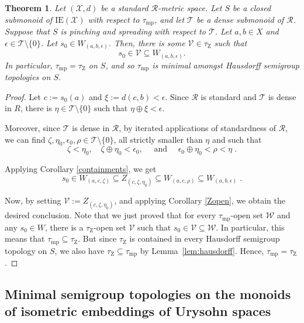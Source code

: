 \documentclass{article}
\newtheorem{theorem}{Theorem}[section]
\theoremstyle{remark}
\theoremstyle{definition}
\newcommand{\V}[0]{\mathcal{V}}
\newcommand{\W}[0]{\mathcal{W}}
\newcommand{\zar}[0]{\tau_{\mathrm{Z}}}
\newcommand{\mpw}[0]{\tau_{\mathrm{mp}}}
\newcommand{\rr}[0]{\mathcal{R}}
\newcommand{\ie}[0]{\mathrm{IE}}
\begin{document}
{{{{{\begin{theorem} \label{Urirealproof} Let $(\mathcal{X}, d)$ be a standard $\rr$-metric space. Let $S$ be a closed submonoid of $\ie(\mathcal{X})$ with respect to $\mpw$, and let $\mathcal{T}$ be a dense submonoid of $\rr$.  Suppose that $S$ is pinching and spreading with respect to $\mathcal{T}$. Let $a, b\in X$ and $\epsilon\in \mathcal{T} \setminus\{0\}$. Let $s_0\in W_{(a,b,\epsilon)}$. Then, there is some $\mathcal{V}\in\zar$ such that 
\[s_0\in \mathcal{V}\subseteq W_{(a,b,\epsilon)}.\]
In particular, $\mpw=\zar$ on $S$, and so $\mpw$ is minimal amongst Hausdorff semigroup topologies on $S$. 
\end{theorem}



\begin{proof} Let $c:=s_0(a)$ and $\xi:=d(c,b)<\epsilon$. Since $\rr$ is standard and $\mathcal{T}$ is dense in $R$, there is $\eta\in \mathcal{T}\setminus\{0\}$ such that $\eta\oplus\xi<\epsilon$. 

Moreover, since 
$\mathcal{T}$ is dense in $\rr$, by iterated applications of standardness of $\rr$, we can find $\zeta, \eta_0, \epsilon_0, \rho\in \mathcal T\setminus\{0\}$, all strictly smaller than $\eta$ and such that 
\[\zeta<\eta_0, \quad \zeta\oplus \eta_0<\epsilon_0, \quad \text{ and } \quad \epsilon_0\oplus\eta_0<\rho<\eta\;.\]

Applying Corollary \ref{containments}, we get
\[ s_0\in W_{(a,c,\zeta)}\subseteq Z_{(c,\zeta,\eta_0)}\subseteq W_{(a,c,\rho)}\subseteq W_{(a, b, \epsilon)}\;.\]

{Now, by setting $\V:=Z_{(c, \zeta, \eta_0)}$, and applying Corollary \ref{Zopen}, we obtain the desired conclusion.}
Note that we just proved that for every $\mpw$-open set $\W$ and any $s_0\in W$, there is a $\zar$-open set $\V$ such that $s_0\in\V\subseteq \W$. In particular, this means that $\mpw\subseteq \zar$. But since $\zar$ is contained in every Hausdorff semigroup topology on $S$, we also have $\zar\subseteq\mpw$ by Lemma~\ref{lem:hausdorff}. Hence, $\mpw=\zar$.
\end{proof}






\subsection{Minimal semigroup topologies on the 
{monoids of isometric} embeddings of Urysohn spaces}

}}}}}
\end{document}
